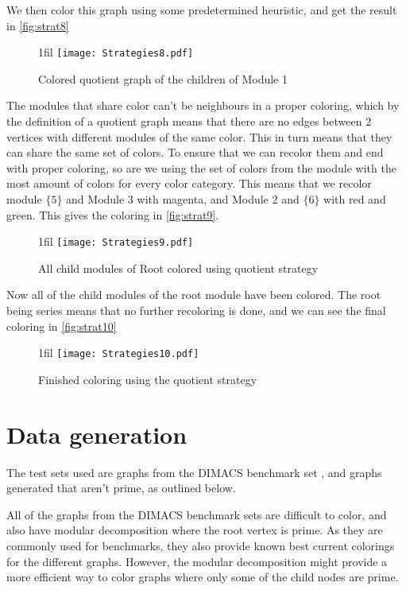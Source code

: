 \documentclass[a4paper]{article}
\makeatletter
\newcommand*{\centerfloat}{%
  \parindent \z@
  \leftskip \z@ \@plus 1fil \@minus \textwidth
  \rightskip\leftskip
  \parfillskip \z@skip}
\makeatother
\begin{document}
We then color this graph using some predetermined heuristic, and get the result
in \autoref{fig:strat8}

\begin{figure}[H]
    \centerfloat
    \texttt{[image: Strategies8.pdf]}
    \caption{Colored quotient graph of the children of Module 1}
    \label{fig:strat8}
\end{figure}

The modules that share color can't be neighbours in a proper coloring,
which by the definition of a quotient graph means that there are no edges
between 2 vertices with different modules of the same color. This in turn means
that they can share the same set of colors. To ensure that we can recolor them
and end with proper coloring, so are we using the set of colors from the module
with the most amount of colors for every color category. This means that we
recolor module $\{5\}$ and Module 3 with magenta, and Module 2 and $\{6\}$ with
red and green. This gives the coloring in \autoref{fig:strat9}.

\begin{figure}[H]
    \centerfloat
    \texttt{[image: Strategies9.pdf]}
    \caption{All child modules of Root colored using quotient strategy}
    \label{fig:strat9}
\end{figure}

Now all of the child modules of the root module have been colored. The root
being series means that no further recoloring is done, and we can see the final
coloring in \autoref{fig:strat10}
\begin{figure}[H]
    \centerfloat
    \texttt{[image: Strategies10.pdf]}
    \caption{Finished coloring using the quotient strategy}
    \label{fig:strat10}
\end{figure}

\section{Data generation}
\label{sec:Data}

The test sets used are graphs from the DIMACS benchmark set \cite{DIMACS}, 
and graphs generated that aren't prime, as outlined below.

All of the graphs from the DIMACS benchmark sets are difficult to color,
and also have modular decomposition where the root vertex is prime. As they are
commonly used for benchmarks, they also provide known best current colorings for the
different graphs. However, the modular decomposition might provide a more
efficient way to color graphs where only some of the child nodes are prime. 
\end{document}

